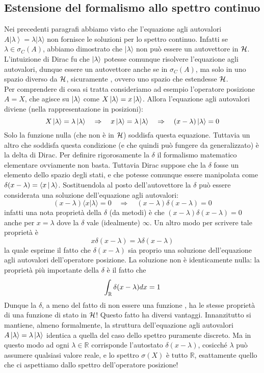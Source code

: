 \documentclass[../../FisicaTeorica.tex]{subfiles}
\begin{document}
\subsection{Estensione del formalismo allo spettro continuo}
Nei precedenti paragrafi abbiamo visto che  l'equazione agli autovalori $A\left|\lambda\right\rangle=\lambda |\lambda  \rangle$ non fornisce le soluzioni per lo spettro continuo.
Infatti se $\lambda \in \sigma_C(A)$, abbiamo dimostrato che $|\lambda\rangle$ non può essere un autovettore in $\mathcal{H}$.
L'intuizione di Dirac fu che $\Ket{\lambda}$ potesse comunque risolvere l'equazione agli autovalori, dunque essere un autovettore anche se in $\sigma_C(A)$, ma solo in uno spazio diverso da $\mathcal{H}$, sicuramente , ovvero uno spazio che estendesse $\mathcal{H}$.\\
Per comprendere di cosa si tratta consideriamo ad esempio l'operatore posizione $A=X$, che agisce su $\Ket{\lambda}$ come $X\Ket{\lambda} = x \Ket{\lambda}$. Allora l'equazione agli autovalori diviene (nella rappresentazione in posizioni):
\[
X\Ket{\lambda} = \lambda\Ket{\lambda} \quad \Rightarrow \quad x\Ket{\lambda} = \lambda\Ket{\lambda} \quad \Rightarrow \quad (x-\lambda)\Ket{\lambda} = 0
\]
Solo la funzione nulla (che non è in $\mathcal{H}$) soddisfa questa equazione. Tuttavia un altro  che soddisfa questa condizione (e che quindi può fungere da  generalizzato) è la delta di Dirac. Per definire rigorosamente la $\delta$ il formalismo matematico elementare ovviamente non basta. Tuttavia Dirac suppose che la $\delta$ fosse un  elemento dello spazio degli stati, e che potesse comunque essere manipolata come  $\delta(x-\lambda) = \Braket{x|\lambda}$. Sostituendola al posto dell'autovettore la $\delta$ può essere considerata una soluzione dell'equazione agli autovalori:
\[
(x-\lambda )\langle x | \lambda \rangle = 0 \quad \Rightarrow \quad (x-\lambda)\delta(x-\lambda) = 0
\]
infatti una nota proprietà della $\delta$ (da metodi) è che $(x - \lambda) \delta(x - \lambda) = 0$ anche per $x = \lambda$ dove la $\delta$ vale (idealmente) $\infty$. Un altro modo per scrivere tale proprietà è
\[
x \delta(x - \lambda) = \lambda \delta(x - \lambda)
\]
la quale esprime il fatto che $\delta(x - \lambda)$ sia proprio una soluzione dell'equazione agli autovalori dell'operatore posizione.
La soluzione non è identicamente nulla: la proprietà più importante della $\delta$ è il fatto che
\[
\int_{\mathbb R} \delta(x - \lambda) d x = 1
\]
Dunque la $\delta$, a meno del fatto di non essere una funzione , ha le stesse proprietà di una funzione di stato  in $\mathcal{H}$! Questo fatto ha diversi vantaggi. Innanzitutto si mantiene, almeno formalmente, la struttura dell'equazione agli autovalori $A\Ket{\lambda} = \lambda \Ket{\lambda}$ identica a quella del caso dello spettro puramente discreto. Ma in questo modo ad ogni $\lambda \in \mathbb R$ corrisponde l'autostato  $\delta(x - \lambda)$, cosicché $\lambda$ può assumere qualsiasi valore reale, e lo spettro $\sigma(X)$ è tutto $\mathbb R$, esattamente quello che ci aspettiamo dallo spettro dell'operatore posizione!
\end{document}
